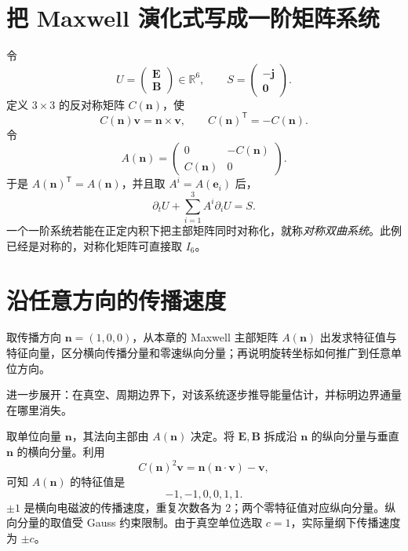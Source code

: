 \documentclass[UTF8,11pt,openany]{ctexbook}
\numberwithin{equation}{chapter}
\theoremstyle{definition}
\theoremstyle{remark}
\newcommand{\RR}{\mathbb R}
\newcommand{\mat}[1]{\begin{pmatrix}#1\end{pmatrix}}
\begin{document}
\section{把 Maxwell 演化式写成一阶矩阵系统}
令
\begin{equation}
U=\mat{\bm E\\\bm B}\in\RR^6,
\qquad S=\mat{-\bm j\\\bm0}.
\end{equation}
定义 $3\times3$ 的反对称矩阵 $C(\bm n)$，使
\begin{equation}
C(\bm n)\bm v=\bm n\times\bm v,
\qquad C(\bm n)^\mathsf T=-C(\bm n).
\end{equation}
令
\begin{equation}\label{eq:An}
A(\bm n)=
\begin{pmatrix}
0&-C(\bm n)\\
C(\bm n)&0
\end{pmatrix}.
\end{equation}
于是 $A(\bm n)^\mathsf T=A(\bm n)$，并且取 $A^i=A(\bm e_i)$ 后，
\begin{equation}\label{eq:matrixhyper}
\boxed{\partial_tU+\sum_{i=1}^3A^i\partial_iU=S.}
\end{equation}
一个一阶系统若能在正定内积下把主部矩阵同时对称化，就称\emph{对称双曲系统}。此例已经是对称的，对称化矩阵可直接取 $I_6$。

\section{沿任意方向的传播速度}
\begin{askai}
取传播方向 $\bm n=(1,0,0)$，从本章的 Maxwell 主部矩阵 $A(\bm n)$ 出发求特征值与特征向量，区分横向传播分量和零速纵向分量；再说明旋转坐标如何推广到任意单位方向。

进一步展开：在真空、周期边界下，对该系统逐步推导能量估计，并标明边界通量在哪里消失。
\end{askai}
取单位向量 $\bm n$，其法向主部由 $A(\bm n)$ 决定。将 $\bm E,\bm B$ 拆成沿 $\bm n$ 的纵向分量与垂直 $\bm n$ 的横向分量。利用
\begin{equation}
C(\bm n)^2\bm v=\bm n(\bm n\cdot\bm v)-\bm v,
\end{equation}
可知 $A(\bm n)$ 的特征值是
\begin{equation}\label{eq:eigenvalues}
\boxed{-1,-1,0,0,1,1.}
\end{equation}
$\pm1$ 是横向电磁波的传播速度，重复次数各为 2；两个零特征值对应纵向分量。纵向分量的取值受 Gauss 约束限制。由于真空单位选取 $c=1$，实际量纲下传播速度为 $\pm c$。
\end{document}
